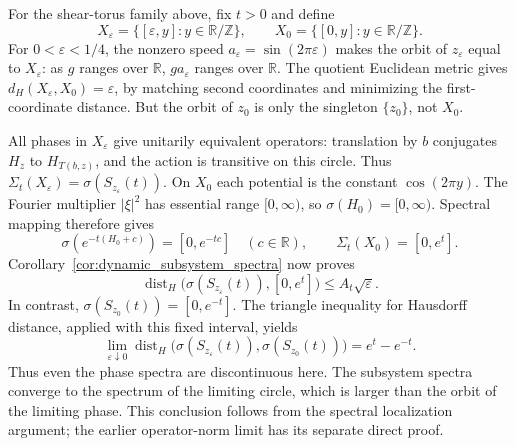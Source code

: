 \begin{example}
For the shear-torus family above, fix $t>0$ and define
\[
X_\varepsilon=\{[\varepsilon,y]:y\in\mathbb R/\mathbb Z\},\qquad
X_0=\{[0,y]:y\in\mathbb R/\mathbb Z\}.
\]
For $0<\varepsilon<1/4$, the nonzero speed
$a_\varepsilon=\sin(2\pi\varepsilon)$ makes the orbit of
$z_\varepsilon$ equal to $X_\varepsilon$: as $g$ ranges over
$\mathbb R$, $ga_\varepsilon$ ranges over $\mathbb R$.
The quotient Euclidean metric gives
$d_H(X_\varepsilon,X_0)=\varepsilon$, by matching second coordinates
and minimizing the first-coordinate distance. But the orbit of $z_0$
is only the singleton $\{z_0\}$, not $X_0$.

All phases in $X_\varepsilon$ give unitarily equivalent operators:
translation by $b$ conjugates $H_z$ to $H_{T(b,z)}$, and the action
is transitive on this circle. Thus
$\Sigma_t(X_\varepsilon)=\sigma(S_{z_\varepsilon}(t))$.
On $X_0$ each potential is the constant $\cos(2\pi y)$.
The Fourier multiplier $|\xi|^2$ has essential range $[0,\infty)$,
so $\sigma(H_0)=[0,\infty)$. Spectral mapping therefore gives
\[
\sigma(e^{-t(H_0+c)})=[0,e^{-tc}]\quad(c\in\mathbb R),
\qquad \Sigma_t(X_0)=[0,e^t].
\]
Corollary~\ref{cor:dynamic_subsystem_spectra} now proves
\[
\operatorname{dist}_H\bigl(\sigma(S_{z_\varepsilon}(t)),[0,e^t]\bigr)
 \leq A_t\sqrt{\varepsilon}.
\]
In contrast, $\sigma(S_{z_0}(t))=[0,e^{-t}]$. The triangle inequality
for Hausdorff distance, applied with this fixed interval, yields
\[
\lim_{\varepsilon\downarrow0}
\operatorname{dist}_H\bigl(\sigma(S_{z_\varepsilon}(t)),
                         \sigma(S_{z_0}(t))\bigr)=e^t-e^{-t}.
\]
Thus even the phase spectra are discontinuous here. The subsystem
spectra converge to the spectrum of the limiting circle, which is
larger than the orbit of the limiting phase. This conclusion follows from the spectral localization argument;
the earlier operator-norm limit has its separate direct proof.
\end{example}



